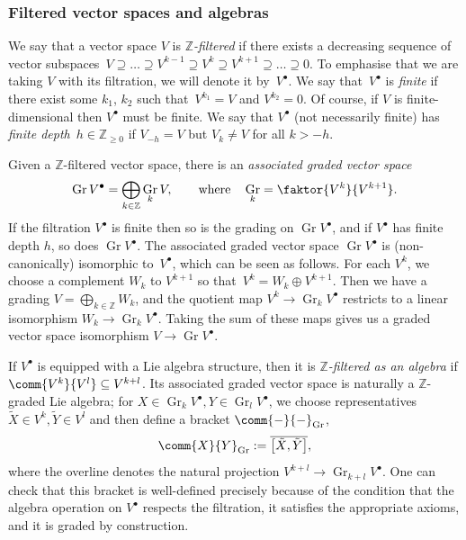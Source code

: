 \documentclass[pdftex]{sigma}
\numberwithin{equation}{section}
\newcommand{\ZZ}{\mathbb{Z}}
\newcommand{\1}{\mathbbm{1}}
\DeclareMathOperator{\Gr}{Gr}
\begin{document}
\subsubsection{Filtered vector spaces and algebras}
\label{sec:filtered-alg}

We say that a vector space $V$ is \emph{$\ZZ$-filtered} if there exists a decreasing sequence of vector subspaces~${V \supseteq \dots \supseteq V^{k-1} \supseteq V^k \supseteq V^{k+1} \supseteq \dots \supseteq 0}$.
To emphasise that we are taking $V$ with its filtration, we will denote it by~$V^\bullet$. We say that~$V^\bullet$ is \emph{finite} if there exist some $k_1$, $k_2$ such that~${V^{k_1}=V}$ and $V^{k_2}=0$. Of course, if $V$ is finite-dimensional then $V^\bullet$ must be finite. We say that $V^\bullet$ (not necessarily finite) has \emph{finite depth}~${h\in\ZZ_{\geq 0}}$ if $V_{-h} = V$ but $V_k\neq V$ for all $k>-h$.

Given a $\ZZ$-filtered vector space, there is an \emph{associated graded vector space}
\[
	\Gr V^\bullet = \bigoplus_{k\in\ZZ} \Gr_k V,\qquad \text{where}\quad \Gr_k = \faktor{V^k}{V^{k+1}}.
\]
If the filtration $V^\bullet$ is finite then so is the grading on $\Gr V^\bullet$, and if $V^\bullet$ has finite depth $h$, so does $\Gr V^\bullet$. The associated graded vector space $\Gr V^\bullet$ is (non-canonically) isomorphic to~$V^\bullet$, which can be seen as follows. For each $V^k$, we choose a complement $W_k$ to $V^{k+1}$ so that~${V^k=W_k\oplus V^{k+1}}$. Then we have a grading $V=\bigoplus_{k\in\ZZ} W_k$, and the quotient map $V^k\to\Gr_k V^\bullet$ restricts to a linear isomorphism $W_k\to\Gr_kV^\bullet$. Taking the sum of these maps gives us a graded vector space isomorphism $V\to\Gr V^\bullet $.

If $V^\bullet$ is equipped with a Lie algebra structure, then it is \emph{$\ZZ$-filtered as an algebra} if $\comm{V^k}{V^l}\subseteq V^{k+l}$. Its associated graded vector space is naturally a $\ZZ$-graded Lie algebra; for $X\in \Gr_k V^\bullet, Y\in \Gr_l V^\bullet$, we choose representatives $\tilde{X}\in V^k,\tilde{Y}\in V^l$ and then define a bracket $\comm{-}{-}_{\mathrm{Gr}}$,
\[
	\comm{X}{Y}_{\mathrm{Gr}} := \overline{\big[\tilde{X},\tilde{Y}\big]},
\]
where the overline denotes the natural projection $V^{k+l}\to\Gr_{k+l}V^\bullet$. One can check that this bracket is well-defined precisely because of the condition that the algebra operation on $V^\bullet$ respects the filtration, it satisfies the appropriate axioms, and it is graded by construction.
\end{document}
